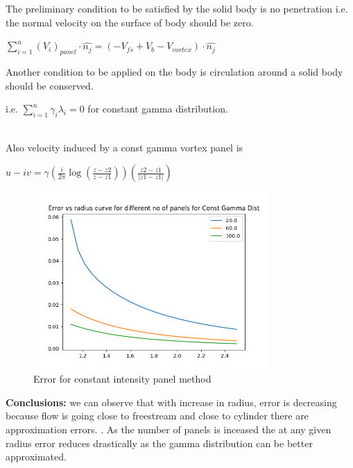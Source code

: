 \documentclass[a4paper,11pt]{article}
\begin{document}
	The preliminary condition to be satisfied by the solid body is no penetration i.e. the normal velocity on the surface of body should be zero.\\
	\begin{center}
	$\sum_{i = 1}^{n} (V_i)_{panel} \cdot  \hat{n_j} = (-V_{fs} + V_{b} - V_{vortex})\cdot\hat{n_j}$ \\
	\end{center}
	Another condition to be applied on the body is circulation around a solid body should be conserved.\\ 
	\begin{center}
	i.e. $\sum_{i = 1}^{n} \gamma _i \lambda_i = 0$ for constant gamma distribution.\\
	\end{center}
		\indent\\
	Also velocity induced by a const gamma vortex panel is\\
	\begin{center}$ u - iv = \gamma(\frac{i}{2\pi}\log(\frac{z - z2}{z - z1}))(\frac{z2 - z1}{{|z1 - z1|}})$\\
	\end{center}
	\begin{figure}[h]
		\centering
		\includegraphics[width = 0.8\textwidth]{q1const_error.png}
		\caption{Error for constant intensity panel method}
		\label{fig:1a}
	\end{figure}
	
	
	
	\indent \textbf{Conclusions:} we can observe that with increase in radius, error is decreasing because
	flow is going close to freestream and close to cylinder there are approximation errors.   .
	As the number of panels is inceased the at any given radius error reduces drastically as the gamma distribution can be better approximated.\\
	
\end{document}
